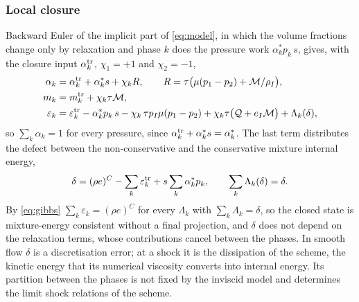 \subsubsection{Local closure}
\label{sec:closure}
Backward Euler of the implicit part of \eqref{eq:model}, in which the volume fractions change only by relaxation and
phase $k$ does the pressure work $\alpha^*_kp_k\,s$, gives, with the closure input $\alpha^{\rm tr}_k$, $\chi_1=+1$ and $\chi_2=-1$,
\begin{equation}
\begin{aligned}
\alpha_k&=\alpha^{\rm tr}_k+\alpha^*_ks+\chi_kR,\qquad R=\tau\big(\mu(p_1-p_2)+\mathcal M/\rho_I\big),\\
m_k&=m^{\rm tr}_k+\chi_k\tau\mathcal M,\\
\varepsilon_k&=\varepsilon^{\rm tr}_k-\alpha^*_kp_k\,s-\chi_k\,\tau p_I\mu(p_1-p_2)+\chi_k\tau\big(\mathcal Q+e_I\mathcal M\big)+\Lambda_k(\delta),
\end{aligned}
\label{eq:gibbs}
\end{equation}
so $\sum_k\alpha_k=1$ for every pressure, since $\alpha^{\rm tr}_k+\alpha^*_ks=\alpha^*_k$. The last term distributes the defect between the non-conservative and the
conservative mixture internal energy,
\begin{equation}
\delta=(\rho e)^C-\sum_k\varepsilon^{\rm tr}_k+s\sum_k\alpha^*_kp_k,\qquad \sum_k\Lambda_k(\delta)=\delta .
\label{eq:defect}
\end{equation}
By \eqref{eq:gibbs} $\sum_k\varepsilon_k=(\rho e)^C$ for every $\Lambda_k$ with $\sum_k\Lambda_k=\delta$, so the closed state is
mixture-energy consistent without a final projection, and $\delta$ does not depend on the relaxation terms, whose
contributions cancel between the phases. In smooth flow $\delta$ is a discretisation error; at a shock it is the dissipation
of the scheme, the kinetic energy that its numerical viscosity converts into internal energy. Its partition between the
phases is not fixed by the inviscid model and determines the limit shock relations of the scheme.


